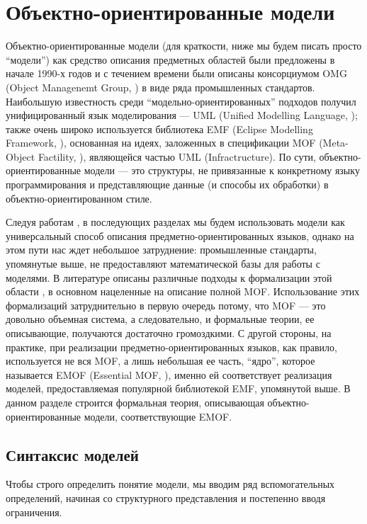 \chapter{Объектно-ориентированные модели}

Объектно-ориентированные модели (для краткости, ниже мы будем писать просто ``модели'') как средство описания предметных областей были предложены в начале 1990-х годов \cite{Booch, Rumbaugh} и с течением времени были описаны консорциумом OMG (Object Managenemt Group, \cite{OMG}) в виде ряда промышленных стандартов. Наибольшую известность среди ``модельно-ориентированных'' подходов получил унифицированный язык моделирования --- UML (Unified Modelling Language, \cite{UML}); также очень широко используется библиотека EMF (Eclipse Modelling Framework, \cite{EMF}), основанная на идеях, заложенных в спецификации MOF (Meta-Object Factility, \cite{MOF}), являющейся частью UML (Infractructure). По сути, объектно-ориентированные модели --- это структуры, не привязанные к конкретному языку программирования и представляющие данные (и способы их обработки) в объектно-ориентированном стиле.

Следуя работам \cite{Fowler, xText}, в последующих разделах мы будем использовать модели как универсальный способ описания предметно-ориентированных языков, однако на этом пути нас ждет небольшое затруднение: промышленные стандарты, упомянутые выше, не предоставляют математической базы для работы с моделями. В литературе описаны различные подходы к формализации этой области \cite{TypeMOF, MaudeMOF, FormalizingMOF}, в основном нацеленные на описание полной MOF. Использование этих формализаций затруднительно в первую очередь потому, что MOF --- это довольно объемная система, а следовательно, и формальные теории, ее описывающие, получаются достаточно громоздкими. С другой стороны, на практике, при реализации предметно-ориентированных языков, как правило, используется не вся MOF, а лишь небольшая ее часть, ``ядро'', которое называется EMOF (Essential MOF, \cite{EMOF}), именно ей соответствует реализация моделей, предоставляемая популярной библиотекой EMF, упомянутой выше. В данном разделе строится формальная теория, описывающая объектно-ориентированные модели, соответствующие EMOF.

\section{Синтаксис моделей}

Чтобы строго определить понятие модели, мы вводим ряд вспомогательных определений, начиная со структурного представления и постепенно вводя ограничения.

